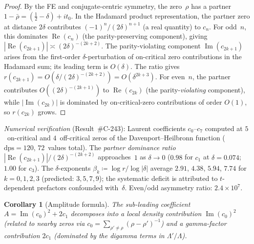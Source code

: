 \documentclass[11pt, a4paper]{article}
\theoremstyle{plain}
\newtheorem{corollary}[theorem]{Corollary}
\theoremstyle{definition}
\begin{document}
\begin{proof}
By the FE and conjugate-centric symmetry,
the zero~$\rho$ has a partner
$1{-}\bar{\rho}=(\tfrac{1}{2}-\delta)+it_0$.
In the Hadamard product representation, the partner zero at distance
$2\delta$ contributes $(-1)^n/(2\delta)^{n+1}$ (a real quantity) to $c_n$.
For odd~$n$, this dominates $\operatorname{Re}(c_n)$ (the parity-preserving
component), giving $|\!\operatorname{Re}(c_{2k+1})|\asymp (2\delta)^{-(2k+2)}$.
The parity-violating component $\operatorname{Im}(c_{2k+1})$ arises from
the first-order $\delta$-perturbation of on-critical zero contributions
in the Hadamard sum; its leading term is $O(\delta)$.
The ratio gives $r(c_{2k+1})=O(\delta/(2\delta)^{-(2k+2)})=O(\delta^{2k+3})$.
For even~$n$, the partner contributes $O((2\delta)^{-(2k+1)})$
to $\operatorname{Re}(c_{2k})$ (the parity-\emph{violating} component),
while $|\!\operatorname{Im}(c_{2k})|$ is dominated by
on-critical-zero contributions of order $O(1)$, so $r(c_{2k})$ grows.
\end{proof}

\noindent\textit{Numerical verification} (Result~\#C-243):
Laurent coefficients $c_0$--$c_7$ computed at $5$~on-critical and
$4$~off-critical zeros of the Davenport--Heilbronn function
($\mathrm{dps}=120$, $72$~values total).
The \emph{partner dominance ratio}
$|\!\operatorname{Re}(c_{2k+1})|/(2\delta)^{-(2k+2)}$
approaches~$1$ as $\delta\to 0$
($0.98$ for $c_1$ at $\delta=0.074$; $1.00$ for $c_3$).
The $\delta$-exponents $\beta_k\coloneqq \log r/\log|\delta|$
average $2.91$, $4.38$, $5.94$, $7.74$ for $k=0,1,2,3$
(predicted: $3,5,7,9$); the systematic deficit is attributed to
$t$-dependent prefactors confounded with~$\delta$.
Even/odd asymmetry ratio: $2.4\times 10^7$.

\begin{corollary}[Amplitude formula]
\label{cor:amplitude}
  The sub-leading coefficient $A=\operatorname{Im}(c_0)^2+2c_1$ decomposes
  into a \emph{local density} contribution $\operatorname{Im}(c_0)^2$
  (related to nearby zeros via $c_0=\sum_{\rho'\neq\rho}(\rho-\rho')^{-1}$)
  and a \emph{gamma-factor} contribution $2c_1$ (dominated by the digamma
  terms in $\Lambda'/\Lambda$).
\end{corollary}
\end{document}

